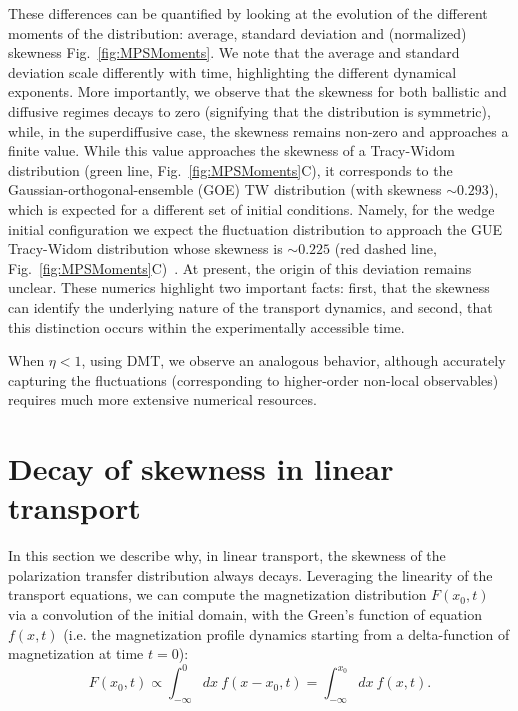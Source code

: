 \documentclass[
 reprint,
 superscriptaddress,
 amsmath,amssymb,
 aps,
 pra,
]{revtex4-2}
\begin{document}
These differences can be quantified by looking at the evolution of the different moments of the distribution: average, standard deviation and (normalized) skewness Fig.~\ref{fig:MPSMoments}.
We note that the average and standard deviation scale differently with time, highlighting the different dynamical exponents.
More importantly, we observe that the skewness for both ballistic and diffusive regimes decays to zero (signifying that the distribution is symmetric), while, in the superdiffusive case, the skewness remains non-zero and approaches a finite value.
While this value approaches the skewness of a Tracy-Widom distribution (green line, Fig.~\ref{fig:MPSMoments}C), it corresponds to the Gaussian-orthogonal-ensemble (GOE) TW distribution (with skewness $\sim 0.293$), which is expected for a different set of initial conditions.
Namely, for the wedge initial configuration we expect the fluctuation distribution to approach the GUE Tracy-Widom distribution whose skewness is $\sim 0.225$ (red dashed line, Fig.~\ref{fig:MPSMoments}C)~\cite{Prahofer2000}.
At present, the origin of this deviation remains unclear.
These numerics highlight two important facts: first, that the skewness can identify the underlying nature of the transport dynamics, and second, that this distinction occurs within the experimentally accessible time. 


When $\eta<1$, using DMT, we observe an analogous behavior, although accurately capturing the fluctuations (corresponding to higher-order non-local observables) requires much more extensive numerical resources.



\section{Decay of skewness in linear transport}

In this section we describe why, in linear transport, the skewness of the polarization transfer distribution always decays.
Leveraging the linearity of the transport equations, we can compute the magnetization distribution $F(x_0,t)$ via a convolution of the initial domain, with the Green's function of equation $f(x,t)$ (i.e. the magnetization profile dynamics starting from a delta-function of magnetization at time $t=0$):
\begin{equation}
    F(x_0,t) \propto \int_{-\infty}^0 dx~f(x-x_0,t) = \int_{-\infty}^{x_0} dx~f(x,t).
\end{equation}
\end{document}

